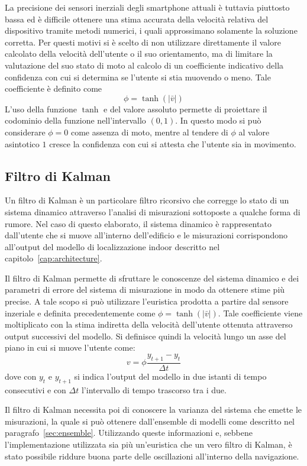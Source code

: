La precisione dei sensori inerziali degli smartphone attuali è tuttavia
piuttosto bassa ed è difficile ottenere una stima accurata della velocità
relativa del dispositivo tramite metodi numerici, i quali approssimano
solamente la soluzione corretta. Per questi motivi si è scelto di non
utilizzare direttamente il valore calcolato della velocità dell'utente o il suo
orientamento, ma di limitare la valutazione del suo stato di moto al calcolo di
un coefficiente indicativo della confidenza con cui si determina se l'utente si
stia muovendo o meno. Tale coefficiente è definito come
\[ \phi = \tanh(|\bar{v}|) \]
L'uso della funzione \(\tanh\) e del valore assoluto permette di proiettare il
codominio della funzione nell'intervallo \( (0,1) \). In questo modo
si può considerare \(\phi = 0\) come assenza di moto, mentre al tendere di
\(\phi\) al valore asintotico \(1\) cresce la confidenza con cui si attesta
che l'utente sia in movimento.

\subsection{Filtro di Kalman}\label{sec:kalman}
Un filtro di Kalman è un particolare filtro ricorsivo che corregge lo stato di
un sistema dinamico attraverso l'analisi di misurazioni sottoposte a qualche
forma di rumore. Nel caso di questo elaborato, il sistema dinamico è
rappresentato dall'utente che si muove all'interno dell'edificio e le
misurazioni corrispondono all'output del modello di localizzazione indoor
descritto nel capitolo~\ref{cap:architecture}.

Il filtro di Kalman permette di sfruttare le conoscenze del sistema dinamico e
dei parametri di errore del sistema di misurazione in modo da ottenere stime
più precise. A tale scopo si può utilizzare l'euristica prodotta a partire dal
sensore inzeriale e definita precedentemente come \(\phi = \tanh(|\bar{v}|)\).
Tale coefficiente viene moltiplicato con la stima indiretta della velocità
dell'utente ottenuta attraverso output successivi del modello. Si definisce
quindi la velocità lungo un asse del piano in cui si muove l'utente come:
\[ v = \phi \frac{y_{t+1} - y_t}{\Delta t} \]
dove con \(y_t\) e \(y_{t+1}\) si indica l'output del modello in due istanti di
tempo consecutivi e con \(\Delta t\) l'intervallo di tempo trascorso tra i due.

Il filtro di Kalman necessita poi di conoscere la varianza del sistema che
emette le misurazioni, la quale si può ottenere dall'ensemble di modelli come
descritto nel paragrafo~\ref{sec:ensemble}. Utilizzando queste informazioni e,
sebbene l'implementazione utilizzata sia più un'euristica che un vero filtro di
Kalman, è stato possibile riddure buona parte delle oscillazioni all'interno
della navigazione.



